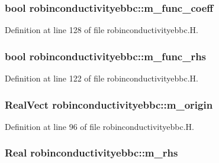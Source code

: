 \subsubsection[{\texorpdfstring{m\+\_\+func\+\_\+coeff}{m_func_coeff}}]{\setlength{\rightskip}{0pt plus 5cm}bool robinconductivityebbc\+::m\+\_\+func\+\_\+coeff\hspace{0.3cm}{\ttfamily [protected]}}\hypertarget{classrobinconductivityebbc_a203e771d233811f97520ac82f2ed0667}{}\label{classrobinconductivityebbc_a203e771d233811f97520ac82f2ed0667}


Definition at line 128 of file robinconductivityebbc.\+H.

\subsubsection[{\texorpdfstring{m\+\_\+func\+\_\+rhs}{m_func_rhs}}]{\setlength{\rightskip}{0pt plus 5cm}bool robinconductivityebbc\+::m\+\_\+func\+\_\+rhs\hspace{0.3cm}{\ttfamily [protected]}}\hypertarget{classrobinconductivityebbc_a68e74a61a0987f9649b11c37deeecab9}{}\label{classrobinconductivityebbc_a68e74a61a0987f9649b11c37deeecab9}


Definition at line 122 of file robinconductivityebbc.\+H.

\subsubsection[{\texorpdfstring{m\+\_\+origin}{m_origin}}]{\setlength{\rightskip}{0pt plus 5cm}Real\+Vect robinconductivityebbc\+::m\+\_\+origin\hspace{0.3cm}{\ttfamily [protected]}}\hypertarget{classrobinconductivityebbc_ad9f0984909661443c1d7c4d207fa8ee8}{}\label{classrobinconductivityebbc_ad9f0984909661443c1d7c4d207fa8ee8}


Definition at line 96 of file robinconductivityebbc.\+H.

\subsubsection[{\texorpdfstring{m\+\_\+rhs}{m_rhs}}]{\setlength{\rightskip}{0pt plus 5cm}Real robinconductivityebbc\+::m\+\_\+rhs\hspace{0.3cm}{\ttfamily [protected]}}\hypertarget{classrobinconductivityebbc_aff33d888b22994b8edf250b109136653}{}\label{classrobinconductivityebbc_aff33d888b22994b8edf250b109136653}


